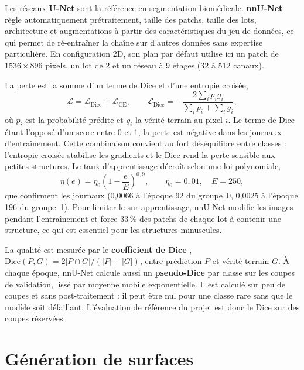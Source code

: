 \documentclass[12pt,a4paper]{report}
\begin{document}
Les réseaux \textbf{U-Net} \cite{ronneberger2015} sont la référence en segmentation biomédicale. \textbf{nnU-Net} \cite{isensee2021} règle automatiquement prétraitement, taille des patchs, taille des lots, architecture et augmentations à partir des caractéristiques du jeu de données, ce qui permet de ré-entraîner la chaîne sur d'autres données sans expertise particulière. En configuration 2D, son plan par défaut utilise ici un patch de $1536\times896$ pixels, un lot de 2 et un réseau à 9 étages (32 à 512 canaux).

La perte est la somme d'un terme de Dice et d'une entropie croisée,
\begin{equation}
\mathcal{L} = \mathcal{L}_{\mathrm{Dice}} + \mathcal{L}_{\mathrm{CE}},
\qquad
\mathcal{L}_{\mathrm{Dice}} = -\frac{2\sum_i p_i g_i}{\sum_i p_i + \sum_i g_i},
\end{equation}
où $p_i$ est la probabilité prédite et $g_i$ la vérité terrain au pixel $i$. Le terme de Dice étant l'opposé d'un score entre 0 et 1, la perte est négative dans les journaux d'entraînement. Cette combinaison convient au fort déséquilibre entre classes : l'entropie croisée stabilise les gradients et le Dice rend la perte sensible aux petites structures. Le taux d'apprentissage décroît selon une loi polynomiale,
\begin{equation}
\eta(e) = \eta_0\left(1-\frac{e}{E}\right)^{0{,}9},
\qquad \eta_0 = 0{,}01,\quad E = 250,
\end{equation}
que confirment les journaux (0,0066 à l'époque 92 du groupe~0, 0,0025 à l'époque 196 du groupe~1). Pour limiter le sur-apprentissage, nnU-Net modifie les images pendant l'entraînement et force 33\,\% des patchs de chaque lot à contenir une structure, ce qui est essentiel pour les structures minuscules.

La qualité est mesurée par le \textbf{coefficient de Dice} \cite{dice1945}, $\mathrm{Dice}(P,G)=2|P\cap G|/(|P|+|G|)$, entre prédiction $P$ et vérité terrain $G$. À chaque époque, nnU-Net calcule aussi un \textbf{pseudo-Dice} par classe sur les coupes de validation, lissé par moyenne mobile exponentielle. Il est calculé sur peu de coupes et sans post-traitement : il peut être nul pour une classe rare sans que le modèle soit défaillant. L'évaluation de référence du projet est donc le Dice sur des coupes réservées.

\section{Génération de surfaces}
\end{document}
